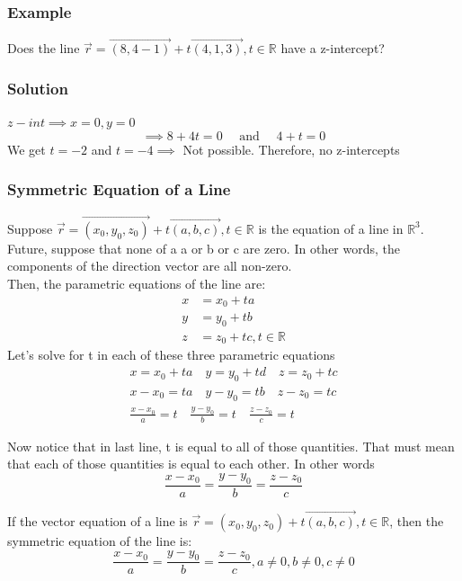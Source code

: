 \documentclass{article}
\begin{document}
\subsubsection*{Example}
Does the line $\vec{r}=\overrightarrow{(8,4-1)}+t\overrightarrow{(4,1,3)},t \in \mathbb{R}$ have a z-intercept?
\subsubsection*{Solution}
$z-int \implies x=0, y=0$\\
\[
    \implies 8+4t=0 \quad \text{ and } \quad 4+t=0
\]
We get $t=-2$ and $t=-4 \implies$ Not possible. Therefore, no z-intercepts 


\subsubsection{Symmetric Equation of a Line}
Suppose $\vec{r}=\overrightarrow{(x_0,y_0,z_0)}+t\overrightarrow{(a,b,c)}, t \in \mathbb{R}$ is the equation of a line in $\mathbb{R}^3$. Future, suppose that none of a a or b or c are zero. In other words, the components of the direction vector are all non-zero.\\

Then, the parametric equations of the line are:
\begin{align*}
    x&=x_0+ta\\
    y&=y_0+tb\\
    z&=z_0+tc, t \in \mathbb{R}
\end{align*}
Let's solve for t in each of these three parametric equations \\
\begin{align*}
    x=x_0+ta \quad y=y_0+td \quad z=z_0+tc\\
    x-x_0=ta \quad y-y_0=tb \quad z-z_0=tc\\
    \boxed{\frac{x-x_0}{a}=t} \quad \boxed{\frac{y-y_0}{b}=t} \quad \boxed{\frac{z-z_0}{c}=t}
\end{align*}

Now notice that in last line, t is equal to all of those quantities. That must mean that each of those quantities is equal to each other. In other words
\[
    \frac{x-x_0}{a}=\frac{y-y_0}{b}=\frac{z-z_0}{c}
\]

\begin{tcolorbox}[colback=red!5!snow, colframe=red!50!white,
  colbacktitle=red!75!mistyrose]
If the vector equation of a line is $\vec{r}=(x_0,y_0,z_0)+t\overrightarrow{(a,b,c)}, t \in \mathbb{R}$, then the symmetric equation of the line is:
\[
    \frac{x-x_0}{a}=\frac{y-y_0}{b}=\frac{z-z_0}{c}, a\neq 0, b \neq 0 , c \neq 0
\]

\end{tcolorbox}
\newpage 
\end{document}
